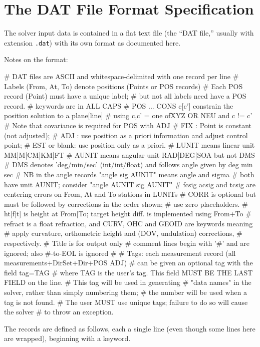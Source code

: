 \chapter{The DAT File Format Specification}
\label{chap:datref}

The solver input data is contained in a flat text file (the ``DAT file,'' usually with extension \verb+.dat+) with its own format as documented here.

Notes on the format:
\begin{Snippet}
# DAT files are ASCII and whitespace-delimited with one record per line
# Labels (From, At, To) denote positions (Points or POS records)
# Each POS record (Point) must have a unique label;
#    but not all labels need have a POS record.
# keywords are in ALL CAPS
# POS ... CONS c[c'] constrain the position solution to a plane[line]
#    using c,c' = one of{XYZ} OR {NEU} and c != c'
# Note that covariance is required for POS with ADJ
# FIX : Point is constant (not adjusted);
# ADJ : use position as a priori information and adjust control point;
# EST or blank: use position only as a priori.
# LUNIT means linear unit MM|M|CM|KM|FT
# AUNIT means angular unit RAD|DEG|SOA but not DMS
# DMS denotes 'deg/min/sec' (int/int/float) and follows angle given by deg min sec
# NB in the angle records "angle sig AUNIT" means angle and sigma
#   both have unit AUNIT; consider "angle AUNIT sig AUNIT"
# fcsig acsig and tcsig are centering errors on From, At and To stations in LUNITs
# CORR is optional but must be followed by corrections in the order shown;
#   use zero placeholders.
# ht[f|t] is height at From|To; target height diff. is implemented using From+To
# refract is a float refraction, and CURV, OHC and GEOID are keywords meaning
#    apply curvature, orthometric height and (DOV, undulation) corrections,
#    respectively.
# Title is for output only
# comment lines begin with '#' and are ignored; also #-to-EOL is ignored
#
# Tags: each measurement record (all measurements+DirSet+Dir+POS ADJ)
#   can be given an optional tag with the field tag=TAG
#  where TAG is the user's tag. This field MUST BE THE LAST FIELD on the line.
#   This tag will be used in generating
#  "data names" in the solver, rather than simply numbering them;
#   the number will be used when a tag is not found.
#  The user MUST use unique tags; failure to do so will cause the solver
#   to throw an exception.
\end{Snippet}

The records are defined as follows, each a single line (even though some lines here are wrapped), beginning with a keyword.

